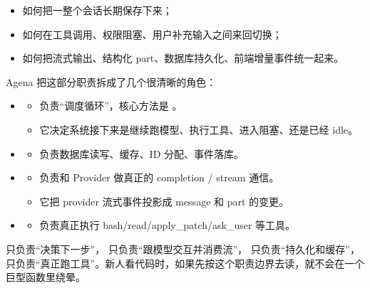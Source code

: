 \documentclass[11pt,a4paper]{ctexart}
\begin{document}
\begin{itemize}
  \item 如何把一整个会话长期保存下来；
  \item 如何在工具调用、权限阻塞、用户补充输入之间来回切换；
  \item 如何把流式输出、结构化 part、数据库持久化、前端增量事件统一起来。
\end{itemize}

Agena 把这部分职责拆成了几个很清晰的角色：

\begin{itemize}
  \item {}
  \begin{itemize}
    \item 负责“调度循环”，核心方法是 。
    \item 它决定系统接下来是继续跑模型、执行工具、进入阻塞、还是已经 idle。
  \end{itemize}
  \item {}
  \begin{itemize}
    \item 负责数据库读写、缓存、ID 分配、事件落库。
  \end{itemize}
  \item {}
  \begin{itemize}
    \item 负责和 Provider 做真正的 completion / stream 通信。
    \item 它把 provider 流式事件投影成 message 和 part 的变更。
  \end{itemize}
  \item {}
  \begin{itemize}
    \item 负责真正执行 bash/read/apply\_patch/ask\_user 等工具。
  \end{itemize}
\end{itemize}

\begin{techbox}[这个拆分为什么好]
 只负责“决策下一步”， 只负责“跟模型交互并消费流”， 只负责“持久化和缓存”， 只负责“真正跑工具”。新人看代码时，如果先按这个职责边界去读，就不会在一个巨型函数里绕晕。
\end{techbox}
\end{document}
